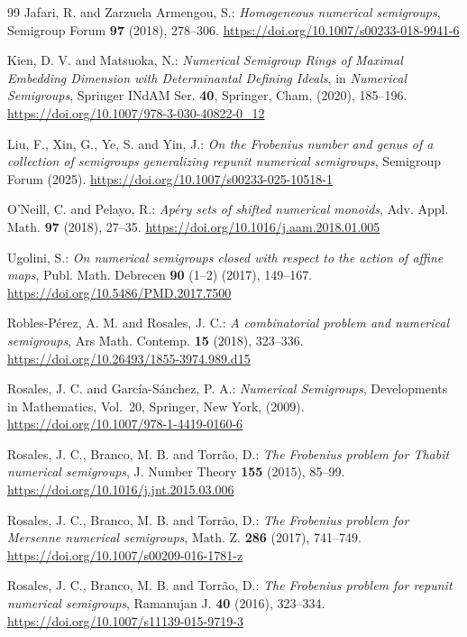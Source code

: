 \documentclass[12pt,a4paper]{amsart}
\theoremstyle{definition}
\begin{document}
\begin{thebibliography}{99}
{Jafari, R. and Zarzuela Armengou, S.}:
\emph{Homogeneous numerical semigroups},
Semigroup Forum \textbf{97} (2018), 278--306.
\url{https://doi.org/10.1007/s00233-018-9941-6}

{Kien, D. V. and Matsuoka, N.}:
\emph{Numerical Semigroup Rings of Maximal Embedding Dimension with Determinantal Defining Ideals},
in \emph{Numerical Semigroups},
Springer INdAM Ser. \textbf{40}, Springer, Cham, (2020), 185--196.
\url{https://doi.org/10.1007/978-3-030-40822-0_12}

{Liu, F., Xin, G., Ye, S. and Yin, J.}:
\emph{On the Frobenius number and genus of a collection of semigroups generalizing repunit numerical semigroups},
Semigroup Forum (2025).
\url{https://doi.org/10.1007/s00233-025-10518-1}

{O'Neill, C. and Pelayo, R.}:
\emph{Ap\'ery sets of shifted numerical monoids},
Adv. Appl. Math. \textbf{97} (2018), 27--35.
\url{https://doi.org/10.1016/j.aam.2018.01.005}

{Ugolini, S.}:
\emph{On numerical semigroups closed with respect to the action of affine maps},
Publ. Math. Debrecen \textbf{90} (1--2) (2017), 149--167.
\url{https://doi.org/10.5486/PMD.2017.7500}

{Robles-P\'erez, A. M. and Rosales, J. C.}:
\emph{A combinatorial problem and numerical semigroups},
Ars Math. Contemp. \textbf{15} (2018), 323--336.
\url{https://doi.org/10.26493/1855-3974.989.d15}

{Rosales, J. C. and Garc\'ia-S\'anchez, P. A.}:
\emph{Numerical Semigroups},
Developments in Mathematics, Vol.~20, Springer, New York, (2009).
\url{https://doi.org/10.1007/978-1-4419-0160-6}

{Rosales, J. C., Branco, M. B. and Torr\~ao, D.}:
\emph{The Frobenius problem for Thabit numerical semigroups},
J. Number Theory \textbf{155} (2015), 85--99.
\url{https://doi.org/10.1016/j.jnt.2015.03.006}

{Rosales, J. C., Branco, M. B. and Torr\~ao, D.}:
\emph{The Frobenius problem for Mersenne numerical semigroups},
Math. Z. \textbf{286} (2017), 741--749.
\url{https://doi.org/10.1007/s00209-016-1781-z}

{Rosales, J. C., Branco, M. B. and Torr\~ao, D.}:
\emph{The Frobenius problem for repunit numerical semigroups},
Ramanujan J. \textbf{40} (2016), 323--334.
\url{https://doi.org/10.1007/s11139-015-9719-3}

\end{thebibliography}
\end{document}
